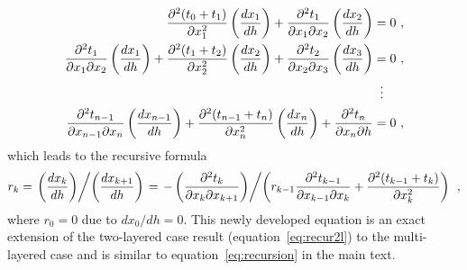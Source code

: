 \begin{align}
 \frac{\partial^2 (t_0 + t_1)}{\partial x_1^2} \left( \frac{d x_1}{d h}\right) + \frac{\partial^2 t_1}{\partial x_1 \partial x_2} \left( \frac{d x_2}{d h}\right) & = 0~, \\
 \nonumber
\frac{\partial^2 t_{1}}{\partial x_{1} \partial x_2} \left( \frac{d x_{1}}{d h}\right) + \frac{\partial^2 (t_{1} + t_2)}{\partial x_2^2} \left( \frac{d x_2}{d h}\right) + \frac{\partial^2 t_2}{\partial x_2 \partial x_{3}}\left( \frac{d x_{3}}{d h}\right) & = 0~, \\
   &\;\;\vdots \notag \\
\nonumber
\frac{\partial^2 t_{n-1}}{\partial x_{n-1} \partial x_n} \left( \frac{d x_{n-1}}{d h}\right) + \frac{\partial^2 (t_{n-1} + t_n)}{\partial x_n^2} \left( \frac{d x_n}{d h}\right) + \frac{\partial^2 t_n}{\partial x_n \partial h} &= 0~, 
\end{align}
which leads to the recursive formula 
\begin{equation}
\label{eq:rnl}
 r_k = \left. \left( \frac{d x_k}{d h}\right) \middle/ \left( \frac{d x_{k+1}}{d h}\right)\right. = \left. -\left( \frac{\partial^2 t_k}{\partial x_k \partial x_{k+1}} \right) \middle/ \left(  r_{k-1} \frac{\partial^2 t_{k-1}}{\partial x_{k-1} \partial x_k}  + \frac{\partial^2 (t_{k-1} + t_k)}{\partial x_k^2} \right)\right. ~,
\end{equation}
where $r_0 = 0$ due to $dx_0/dh = 0$. This newly developed equation is an exact extension of the two-layered case result (equation~\ref{eq:recur2l}) to the multi-layered case and is similar to equation~\ref{eq:recursion} in the main text.



